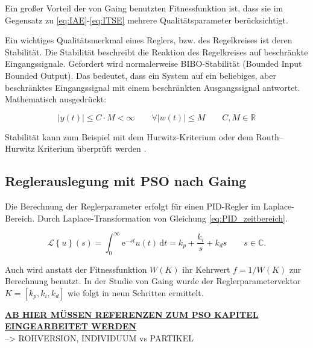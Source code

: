  Ein
gro\ss er Vorteil der von Gaing benutzten Fitnessfunktion ist, dass sie im
Gegensatz zu \eqref{eq:IAE}-\eqref{eq:ITSE} mehrere Qualit\"atsparameter
ber\"ucksichtigt.

Ein wichtiges Qualit\"atsmerkmal eines Reglers, bzw. des Regelkreises ist deren
Stabilit\"at. Die Stabilit\"at beschreibt die Reaktion des Regelkreises auf
beschr\"ankte Eingangssignale. Gefordert wird normalerweise BIBO-Stabilit\"at
(Bounded Input Bounded Output). Das bedeutet, dass ein System auf ein
beliebiges, aber beschr\"anktes Eingangssignal mit einem beschr\"ankten
Ausgangssignal antwortet. Mathematisch ausgedr\"uckt:

\begin{equation}
    |y(t)| \leq C \cdot M < \infty\qquad\forall|w(t)| \leq M\qquad C,M\in \mathbb{R}
\end{equation}

Stabilit\"at kann zum Beispiel mit dem Hurwitz-Kriterium oder dem Routh–Hurwitz Kriterium \"uberpr\"uft werden \parencite{routh1877treatise}.

\subsection{Reglerauslegung mit PSO nach Gaing}

Die Berechnung der Reglerparameter erfolgt f\"ur einen PID-Regler im Laplace-Bereich. Durch Laplace-Transformation von Gleichung \eqref{eq:PID_zeitbereich}.

\begin{equation}
    \mathcal{L}\left\{u\right\}(s) =\int_{0}^{\infty} \mathrm{e}^{-st} u(t)\,\mathrm{d}t=k_p+\frac{k_i}{s}+k_ds \qquad s\in\mathbb{C}.
\end{equation}

Auch wird anstatt der Fitnessfunktion $W(K)$ ihr Kehrwert $f=1/W(K)$ zur Berechnung benutzt.
In der Studie von Gaing \parencite{bib:pso_pid_gaing} wurde der Reglerparametervektor $K=[k_p,k_i,k_d]$ wie folgt in neun Schritten ermittelt.

\underline{\textbf{AB HIER M\"USSEN REFERENZEN ZUM PSO KAPITEL EINGEARBEITET WERDEN}}\\
--> ROHVERSION, INDIVIDUUM vs PARTIKEL

